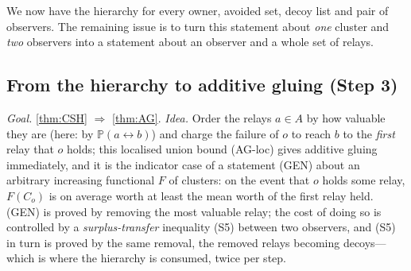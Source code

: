 \documentclass[11pt]{article}
\theoremstyle{definition}
\theoremstyle{remark}
\newcommand{\PP}{\mathbb{P}}
\newcommand{\con}{\leftrightarrow}
\begin{document}
We now have the hierarchy for every owner, avoided set, decoy list and pair of observers.  The remaining issue is to turn this statement about
\emph{one} cluster and \emph{two} observers into a statement about an observer and a whole set of relays.

\subsection{From the hierarchy to additive gluing (Step 3)}\label{ss:reduction}
\emph{Goal.}  \cref{thm:CSH} $\Rightarrow$ \cref{thm:AG}.  \emph{Idea.}  Order the relays $a\in A$ by how valuable they are (here: by $\PP(a\con b)$)
and charge the failure of $o$ to reach $b$ to the \emph{first} relay that $o$ holds; this localised union bound (AG-loc) gives additive gluing
immediately, and it is the indicator case of a statement (GEN) about an arbitrary increasing functional $F$ of clusters: on the event that $o$ holds
some relay, $F(C_o)$ is on average worth at least the mean worth of the first relay held.  (GEN) is proved by removing the most valuable relay;
the cost of doing so is controlled by a \emph{surplus-transfer} inequality (S5) between two observers, and (S5) in turn is proved by the same
removal, the removed relays becoming decoys---which is where the hierarchy is consumed, twice per step.
\end{document}
